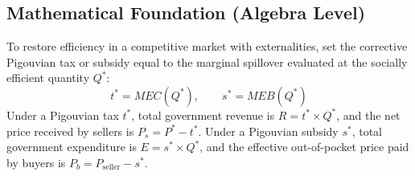 \documentclass[11pt,letterpaper]{article}
\begin{document}
\subsection*{Mathematical Foundation (Algebra Level)}
To restore efficiency in a competitive market with externalities, set the corrective Pigouvian tax or subsidy equal to the marginal spillover evaluated at the socially efficient quantity $Q^*$:
\begin{equation}
t^* = MEC(Q^*), \qquad s^* = MEB(Q^*)
\end{equation}
Under a Pigouvian tax $t^*$, total government revenue is $R = t^* \times Q^*$, and the net price received by sellers is $P_s = P^* - t^*$. Under a Pigouvian subsidy $s^*$, total government expenditure is $E = s^* \times Q^*$, and the effective out-of-pocket price paid by buyers is $P_b = P_{\text{seller}} - s^*$.
\end{document}
